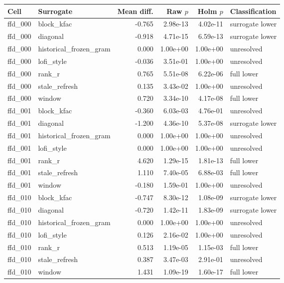 \begin{table}[p]
\centering\tiny
\begin{tabular}{llrrrl}
\toprule
Cell & Surrogate & Mean diff. & Raw $p$ & Holm $p$ & Classification \\
\midrule
ffd\_000 & block\_kfac & -0.765 & 2.98e-13 & 4.02e-11 & surrogate lower \\
ffd\_000 & diagonal & -0.918 & 4.71e-15 & 6.59e-13 & surrogate lower \\
ffd\_000 & historical\_frozen\_gram & 0.000 & 1.00e+00 & 1.00e+00 & unresolved \\
ffd\_000 & lofi\_style & -0.036 & 3.51e-01 & 1.00e+00 & unresolved \\
ffd\_000 & rank\_r & 0.765 & 5.51e-08 & 6.22e-06 & full lower \\
ffd\_000 & stale\_refresh & 0.135 & 3.43e-02 & 1.00e+00 & unresolved \\
ffd\_000 & window & 0.720 & 3.34e-10 & 4.17e-08 & full lower \\
ffd\_001 & block\_kfac & -0.360 & 6.03e-03 & 4.76e-01 & unresolved \\
ffd\_001 & diagonal & -1.200 & 4.36e-10 & 5.37e-08 & surrogate lower \\
ffd\_001 & historical\_frozen\_gram & 0.000 & 1.00e+00 & 1.00e+00 & unresolved \\
ffd\_001 & lofi\_style & 0.000 & 1.00e+00 & 1.00e+00 & unresolved \\
ffd\_001 & rank\_r & 4.620 & 1.29e-15 & 1.81e-13 & full lower \\
ffd\_001 & stale\_refresh & 1.110 & 7.40e-05 & 6.88e-03 & full lower \\
ffd\_001 & window & -0.180 & 1.59e-01 & 1.00e+00 & unresolved \\
ffd\_010 & block\_kfac & -0.747 & 8.30e-12 & 1.08e-09 & surrogate lower \\
ffd\_010 & diagonal & -0.720 & 1.42e-11 & 1.83e-09 & surrogate lower \\
ffd\_010 & historical\_frozen\_gram & 0.000 & 1.00e+00 & 1.00e+00 & unresolved \\
ffd\_010 & lofi\_style & 0.126 & 2.16e-02 & 1.00e+00 & unresolved \\
ffd\_010 & rank\_r & 0.513 & 1.19e-05 & 1.15e-03 & full lower \\
ffd\_010 & stale\_refresh & 0.387 & 3.47e-03 & 2.91e-01 & unresolved \\
ffd\_010 & window & 1.431 & 1.09e-19 & 1.60e-17 & full lower \\

\end{tabular}
\end{table}
